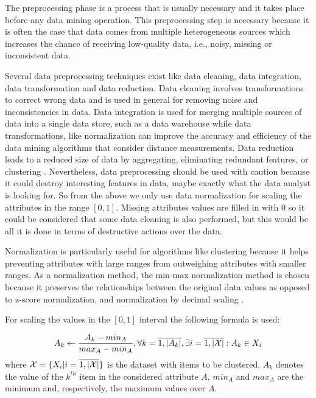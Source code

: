 The preprocessing phase is a process that is usually necessary and it takes place before any data mining operation. This preprocessing step is necessary because it is often the case that data comes from multiple heterogeneous sources which increases the chance of receiving low-quality data, i.e., noisy, missing or inconsistent data. 

Several data preprocessing techniques exist like data cleaning, data integration, data transformation and data reduction. Data cleaning involves transformations to correct wrong data and is used in general for removing noise and inconsistencies in data. Data integration is used for merging multiple sources of data into a single data store, such as a data warehouse while data transformations, like normalization can improve the accuracy and efficiency of the data mining algorithms that consider distance measurements. Data reduction leads to a reduced size of data by aggregating, eliminating redundant features, or clustering \cite{Han06DataMining}. Nevertheless, data preprocessing should be used with caution because it could destroy interesting features in data, maybe exactly what the data analyst is looking for. So from the above we only use data normalization for scaling the attributes in the range $[0, 1]$. Missing attributes values are filled in with $0$ so it could be considered that some data cleaning is also performed, but this would be all it is done in terms of destructive actions over the data. 

Normalization is particularly useful for algorithms like clustering because it helps preventing attributes with large ranges from outweighing attributes with smaller ranges. As a normalization method, the min-max normalization method is chosen because it preserves the relationships between the original data values as opposed to z-score normalization, and normalization by decimal scaling \cite{Han06DataMining}. 

For scaling the values in the $[0, 1]$ interval the following formula is used:

\begin{align}
A_{k} \leftarrow \frac{A_{k} - min_A}{max_A - min_A}, \forall k=\overline{1,\lvert A_{k} \rvert}, \exists i=\overline{1,\lvert \mathcal X \rvert}: A_{k} \in X_{i}
\end{align}
where $\mathcal X = \{X_i \vert i=\overline{1,\lvert \mathcal X \rvert}\}$ is the dataset with items to be clustered, $A_k$ denotes the value of the $k^{th}$ item in the considered attribute $A$, 
$min_A$ and $max_A$ are the minimum and, respectively, the maximum values over $A$.

